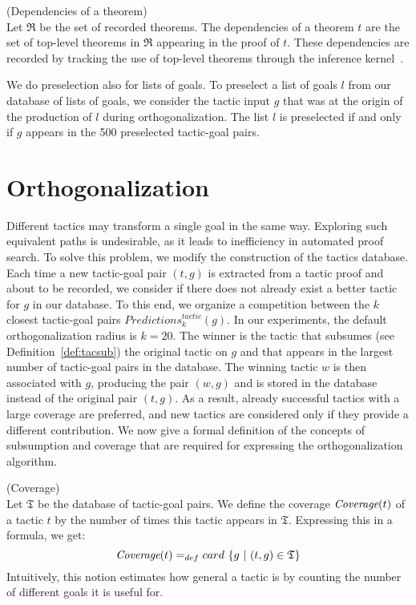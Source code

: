 \documentclass[runningheads,a4paper,draft]{svjour3}
\begin{document}
\begin{definition}(Dependencies of a theorem)\\
Let $\mathfrak{R}$ be the set of recorded theorems.
The dependencies of a theorem $t$ are the set of top-level theorems in
$\mathfrak{R}$ appearing in the proof of $t$. These dependencies are
recorded by tracking the use of top-level theorems through the inference
kernel~\cite{tgck-cpp15}.
\end{definition}

We do preselection also for lists of goals.
To preselect a list of goals $l$ from our database of lists of goals, we
consider the tactic input $g$ that was at the origin of the production of $l$
during orthogonalization. The list $l$ is preselected if and only if $g$
appears in the 500 preselected tactic-goal pairs.

\section{Orthogonalization}\label{sec:ortho}
Different tactics may transform a single goal in the same way. Exploring such
equivalent paths
is undesirable, as it leads to inefficiency in automated proof search.
To solve this problem, we modify the construction of the tactics database.
Each time a new tactic-goal pair $(t,g)$ is extracted from a tactic proof and
about to be recorded, we consider if there does not already exist a better
tactic for $g$ in our database. To this end, we organize a competition between
the
$k$ closest tactic-goal pairs $\mathit{Predictions}^{\mathit{tactic}}_k(g)$.
In our experiments,
the default orthogonalization radius is $k=20$.
The winner is the tactic that subsumes (see Definition~\ref{def:tacsub}) the
original tactic on $g$ and that
appears in the largest number of tactic-goal pairs in the database.
The winning tactic $w$ is then associated with $g$, producing the pair $(w,g)$
and is stored in the database instead of the original pair $(t,g)$.
As a result, already successful tactics with a large coverage are preferred,
and new tactics are considered only if they provide a different contribution.
We now give a formal definition of the concepts of subsumption and coverage
that are required for expressing the orthogonalization algorithm.

\begin{definition} (Coverage)\\
Let $\mathfrak{T}$ be the database of tactic-goal pairs. We define the
coverage $\textit{\mbox{Coverage}}(t)$ of a tactic $t$ by the number of times
this tactic
appears in
$\mathfrak{T}$. Expressing this in a formula, we get:
  \[\textit{\mbox{Coverage}}(t) =_{def} card\ \lbrace g\ |\ (t,g) \in
  \mathfrak{T} \rbrace \]
Intuitively, this notion estimates how general a tactic is by counting the
number of different goals it is useful for.
\end{definition}
\end{document}
